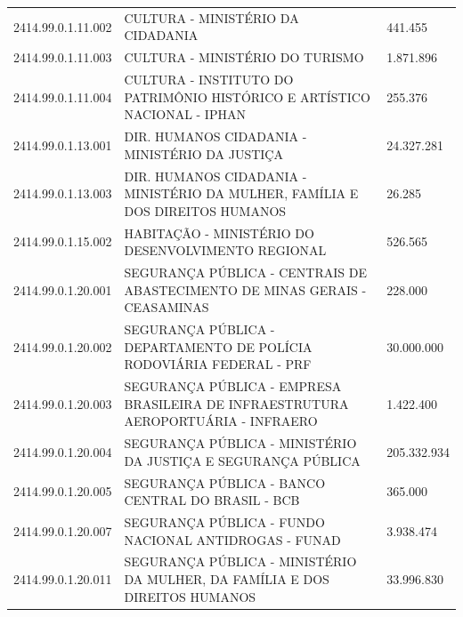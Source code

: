 \documentclass{article}
\begin{document}
\begin{longtable}[c]{m{2cm}|m{13cm}|m{2cm}}
\multicolumn{1}{C{2cm}|}{2414.99.0.1.11.002} & \multicolumn{1}{L{13cm}|}{CULTURA - MINISTÉRIO DA CIDADANIA} & \multicolumn{1}{R{2cm}}{441.455} \\
\multicolumn{1}{C{2cm}|}{2414.99.0.1.11.003} & \multicolumn{1}{L{13cm}|}{CULTURA - MINISTÉRIO DO TURISMO} & \multicolumn{1}{R{2cm}}{1.871.896} \\
\multicolumn{1}{C{2cm}|}{2414.99.0.1.11.004} & \multicolumn{1}{L{13cm}|}{CULTURA - INSTITUTO DO PATRIMÔNIO HISTÓRICO E ARTÍSTICO NACIONAL - IPHAN} & \multicolumn{1}{R{2cm}}{255.376} \\
\multicolumn{1}{C{2cm}|}{2414.99.0.1.13.001} & \multicolumn{1}{L{13cm}|}{DIR. HUMANOS CIDADANIA - MINISTÉRIO DA JUSTIÇA} & \multicolumn{1}{R{2cm}}{24.327.281} \\
\multicolumn{1}{C{2cm}|}{2414.99.0.1.13.003} & \multicolumn{1}{L{13cm}|}{DIR. HUMANOS CIDADANIA - MINISTÉRIO DA MULHER, FAMÍLIA E DOS DIREITOS HUMANOS} & \multicolumn{1}{R{2cm}}{26.285} \\
\multicolumn{1}{C{2cm}|}{2414.99.0.1.15.002} & \multicolumn{1}{L{13cm}|}{HABITAÇÃO - MINISTÉRIO DO DESENVOLVIMENTO REGIONAL} & \multicolumn{1}{R{2cm}}{526.565} \\
\multicolumn{1}{C{2cm}|}{2414.99.0.1.20.001} & \multicolumn{1}{L{13cm}|}{SEGURANÇA PÚBLICA - CENTRAIS DE ABASTECIMENTO DE MINAS GERAIS - CEASAMINAS} & \multicolumn{1}{R{2cm}}{228.000} \\
\multicolumn{1}{C{2cm}|}{2414.99.0.1.20.002} & \multicolumn{1}{L{13cm}|}{SEGURANÇA PÚBLICA - DEPARTAMENTO DE POLÍCIA RODOVIÁRIA FEDERAL - PRF} & \multicolumn{1}{R{2cm}}{30.000.000} \\
\multicolumn{1}{C{2cm}|}{2414.99.0.1.20.003} & \multicolumn{1}{L{13cm}|}{SEGURANÇA PÚBLICA - EMPRESA BRASILEIRA DE INFRAESTRUTURA AEROPORTUÁRIA - INFRAERO} & \multicolumn{1}{R{2cm}}{1.422.400} \\
\multicolumn{1}{C{2cm}|}{2414.99.0.1.20.004} & \multicolumn{1}{L{13cm}|}{SEGURANÇA PÚBLICA - MINISTÉRIO DA JUSTIÇA E SEGURANÇA PÚBLICA} & \multicolumn{1}{R{2cm}}{205.332.934} \\
\multicolumn{1}{C{2cm}|}{2414.99.0.1.20.005} & \multicolumn{1}{L{13cm}|}{SEGURANÇA PÚBLICA - BANCO CENTRAL DO BRASIL - BCB} & \multicolumn{1}{R{2cm}}{365.000} \\
\multicolumn{1}{C{2cm}|}{2414.99.0.1.20.007} & \multicolumn{1}{L{13cm}|}{SEGURANÇA PÚBLICA - FUNDO NACIONAL ANTIDROGAS - FUNAD} & \multicolumn{1}{R{2cm}}{3.938.474} \\
\multicolumn{1}{C{2cm}|}{2414.99.0.1.20.011} & \multicolumn{1}{L{13cm}|}{SEGURANÇA PÚBLICA - MINISTÉRIO DA MULHER, DA FAMÍLIA E DOS DIREITOS HUMANOS} & \multicolumn{1}{R{2cm}}{33.996.830} \\

\end{longtable}
\end{document}
